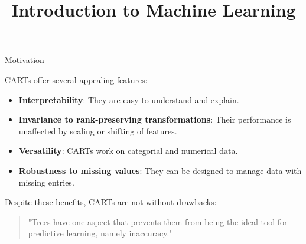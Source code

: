 \documentclass[11pt,compress,t,notes=noshow, xcolor=table]{beamer}
\title{Introduction to Machine Learning}
\begin{document}

\begin{vbframe}{Motivation}

CARTs offer several appealing features:

\begin{itemize}
  \item \textbf{Interpretability}: They are easy to understand and explain.
  \item \textbf{Invariance to rank-preserving transformations}: Their performance is unaffected by scaling or shifting of features.
  \item \textbf{Versatility}: CARTs work on categorial and numerical data.
  \item \textbf{Robustness to missing values}: They can be designed to manage data with missing entries.
\end{itemize}

\vspace{1em}
Despite these benefits, CARTs are not without drawbacks:
\vspace{1em}

\begin{quotation}
"Trees have one aspect that prevents them from being the ideal tool for predictive learning, namely inaccuracy."
\end{quotation}

\end{vbframe}
\end{document}
